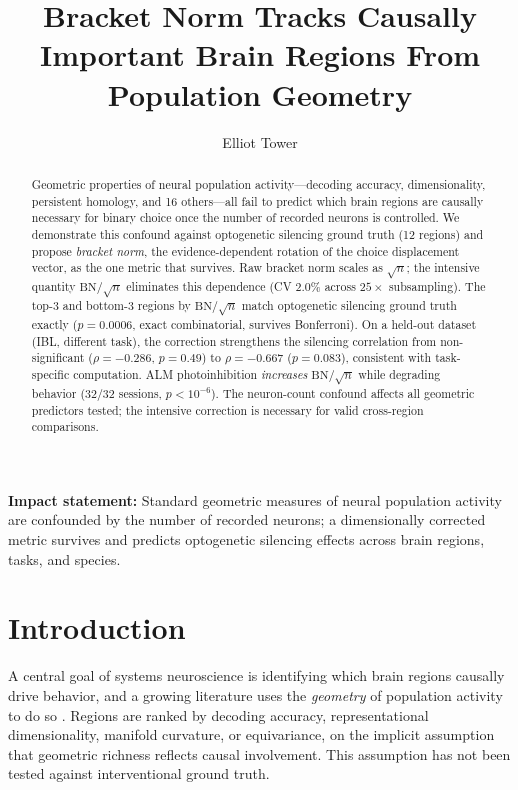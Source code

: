 \documentclass[9pt,lineno]{elife}
\title{Bracket Norm Tracks Causally Important Brain Regions From Population Geometry}
\author[1]{Elliot Tower}
\affil[1]{Independent Researcher}
\begin{document}
\maketitle

\begin{abstract}
Geometric properties of neural population activity---decoding accuracy, dimensionality, persistent homology, and 16 others---all fail to predict which brain regions are causally necessary for binary choice once the number of recorded neurons is controlled. We demonstrate this confound against optogenetic silencing ground truth (12 regions) and propose \emph{bracket norm}, the evidence-dependent rotation of the choice displacement vector, as the one metric that survives. Raw bracket norm scales as $\sqrt{n}$; the intensive quantity $\text{BN}/\!\sqrt{n}$ eliminates this dependence (CV $2.0\%$ across $25\times$ subsampling). The top-3 and bottom-3 regions by $\text{BN}/\!\sqrt{n}$ match optogenetic silencing ground truth exactly ($p = 0.0006$, exact combinatorial, survives Bonferroni). On a held-out dataset (IBL, different task), the correction strengthens the silencing correlation from non-significant ($\rho = -0.286$, $p = 0.49$) to $\rho = -0.667$ ($p = 0.083$), consistent with task-specific computation. ALM photoinhibition \emph{increases} $\text{BN}/\!\sqrt{n}$ while degrading behavior (32/32 sessions, $p < 10^{-6}$). The neuron-count confound affects all geometric predictors tested; the intensive correction is necessary for valid cross-region comparisons.
\end{abstract}

\noindent\textbf{Impact statement:} Standard geometric measures of neural population activity are confounded by the number of recorded neurons; a dimensionally corrected metric survives and predicts optogenetic silencing effects across brain regions, tasks, and species.

\section{Introduction}

A central goal of systems neuroscience is identifying which brain regions causally drive behavior, and a growing literature uses the \emph{geometry} of population activity to do so \citep{cunningham2014dimensionality, gallego2017neural}. Regions are ranked by decoding accuracy, representational dimensionality, manifold curvature, or equivariance, on the implicit assumption that geometric richness reflects causal involvement. This assumption has not been tested against interventional ground truth.
\end{document}
